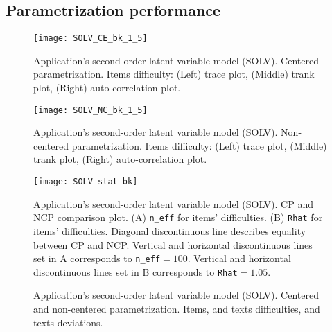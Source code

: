 \subsection{Parametrization performance} \label{app_c5:noncenter}

%
\begin{figure}[H]
	\centering
	\texttt{[image: SOLV\_CE\_bk\_1\_5]}
	\caption[Application's second-order latent variable model (SOLV). Centered parametrization. Items difficulty. Trace, trank and auto-correlation plots.]%
	{Application's second-order latent variable model (SOLV). Centered parametrization. Items difficulty: (Left) trace plot, (Middle) trank plot, (Right) auto-correlation plot.}
	\label{fig:FOLV_CE_chains1}
\end{figure}

%
\begin{figure}[H]
	\centering
	\texttt{[image: SOLV\_NC\_bk\_1\_5]}
	\caption[Application's second-order latent variable model (SOLV). Non-centered parametrization. Items difficulty. Trace, trank and auto-correlation plots.]%
	{Application's second-order latent variable model (SOLV). Non-centered parametrization. Items difficulty: (Left) trace plot, (Middle) trank plot, (Right) auto-correlation plot.}
	\label{fig:FOLV_NC_chains1}
\end{figure}
%
\begin{figure}[H]
	\centering
	\texttt{[image: SOLV\_stat\_bk]}
	\caption[Application's second-order latent variable model (SOLV). CP and NCP comparison plot.]%
	{Application's second-order latent variable model (SOLV). CP and NCP comparison plot. (A) \texttt{n\_eff} for items' difficulties. (B) \texttt{Rhat} for items' difficulties. Diagonal discontinuous line describes equality between CP and NCP. Vertical and horizontal discontinuous lines set in A corresponds to \texttt{n\_eff}$=100$. Vertical and horizontal discontinuous lines set in B corresponds to \texttt{Rhat}$=1.05$. }
	\label{fig:SOLV_stat_bk1}
\end{figure}
%
\begin{figure}[H]
	\centering
	\begin{subfigure}
		\texttt{[image: SOLV\_recovery\_items]}
	\end{subfigure}
	\begin{subfigure}
		\texttt{[image: SOLV\_recovery\_texts]}
	\end{subfigure}
	\caption[Application's second-order latent variable model (SOLV). Centered and non-centered parametrization. Items, and texts difficulties, and texts deviations.]%
	{Application's second-order latent variable model (SOLV). Centered and non-centered parametrization. Items, and texts difficulties, and texts deviations.}
	\label{fig:SOLV_CE.NC_recovery}
\end{figure}
